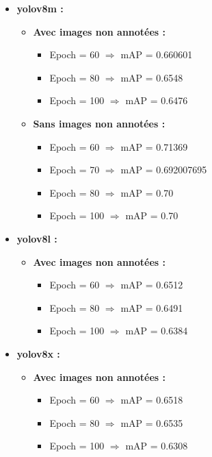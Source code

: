 \begin{itemize}
	\item \textbf{yolov8m :}
	      \begin{itemize}
		      \item \textbf{Avec images non annotées :}
		            \begin{itemize}
			            \item Epoch = 60 $\Rightarrow$ mAP = 0.660601
			            \item Epoch = 80 $\Rightarrow$ mAP = 0.6548
			            \item Epoch = 100 $\Rightarrow$ mAP = 0.6476
		            \end{itemize}
		      \item \textbf{Sans images non annotées :}
		            \begin{itemize}
			            \item Epoch = 60 $\Rightarrow$ mAP = 0.71369
			            \item Epoch = 70 $\Rightarrow$ mAP = 0.692007695
			            \item Epoch = 80 $\Rightarrow$ mAP = 0.70
			            \item Epoch = 100 $\Rightarrow$ mAP = 0.70
		            \end{itemize}
	      \end{itemize}

	\item \textbf{yolov8l :}
	      \begin{itemize}
		      \item \textbf{Avec images non annotées :}
		            \begin{itemize}
			            \item Epoch = 60 $\Rightarrow$ mAP = 0.6512
			            \item Epoch = 80 $\Rightarrow$ mAP = 0.6491
			            \item Epoch = 100 $\Rightarrow$ mAP = 0.6384
		            \end{itemize}
	      \end{itemize}

	\item \textbf{yolov8x :}
	      \begin{itemize}
		      \item \textbf{Avec images non annotées :}
		            \begin{itemize}
			            \item Epoch = 60 $\Rightarrow$ mAP = 0.6518
			            \item Epoch = 80 $\Rightarrow$ mAP = 0.6535
			            \item Epoch = 100 $\Rightarrow$ mAP = 0.6308
		            \end{itemize}
	      \end{itemize}
\end{itemize}


